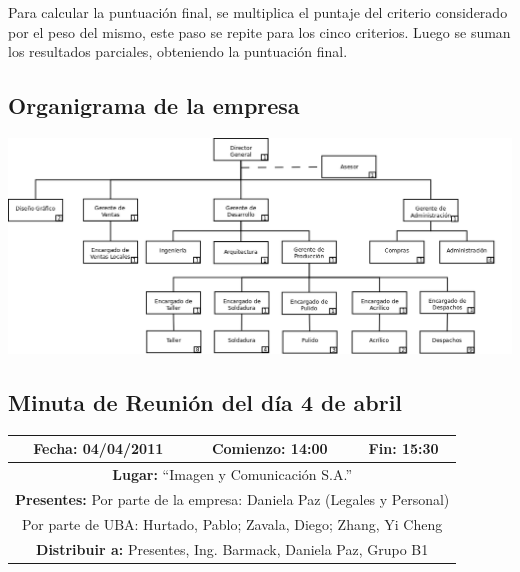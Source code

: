 \documentclass[a4paper,10pt,titlepage]{article}
\begin{document}
Para calcular la puntuación final, se multiplica el puntaje del criterio considerado por el peso del mismo, este paso se repite para los cinco criterios. Luego se suman los resultados parciales, obteniendo la puntuación final.
\newpage

\subsection{Organigrama de la empresa}
\begin{center}
\includegraphics[scale=0.55,angle=90,keepaspectratio=true]{./organinuestro.png}
\end{center}

\newpage

\subsection{Minuta de Reuni\'on del d\'ia 4 de abril}
\vspace{1cm}
\begin{center}
\begin{tabular}{|c|c|c|}
	\hline
	\textbf{Fecha:} 04/04/2011 &  \textbf{Comienzo:} 14:00  &  \textbf{Fin:} 15:30 \\ \hline	

	\multicolumn{3}{|c|}{\textbf{Lugar:} ``Imagen y Comunicaci\'on S.A.''} \\
	\hline \multicolumn{3}{|p{12.5cm}|}{\textbf{Presentes:} Por parte de la empresa: Daniela Paz (Legales y Personal)} \\
	\multicolumn{3}{|p{12.5cm}|}{Por parte de UBA: Hurtado, Pablo; Zavala, Diego; Zhang, Yi Cheng} \\
	\hline \multicolumn{3}{|p{12.5cm}|}{\textbf{Distribuir a:} Presentes, Ing. Barmack, Daniela Paz, Grupo B1}\\
	\hline
\end{tabular} 
\end{center}
\end{document}

